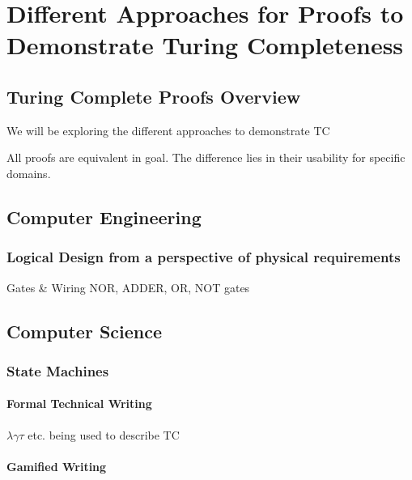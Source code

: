 \chapter{Different Approaches for Proofs to Demonstrate Turing Completeness}

\section{Turing Complete Proofs Overview}

We will be exploring the different approaches to demonstrate TC

All proofs are equivalent in goal.
The difference lies in their usability for specific domains.

\section{Computer Engineering}

\subsection{Logical Design from a perspective of physical requirements}

Gates \& Wiring
NOR, ADDER, OR, NOT gates

\section{Computer Science}

\subsection{State Machines}

\subsubsection{Formal Technical Writing}

$\lambda \gamma \tau $ etc. being used to describe TC

\subsubsection{Gamified Writing}

